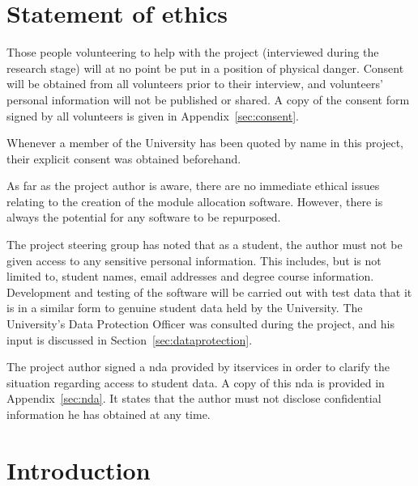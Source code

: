 \documentclass[draft]{scrartcl}
\let\stdsection\section
\renewcommand\section{\clearpage\stdsection}
\begin{document}
\clearpage
\tableofcontents

\clearpage
\listoffigures

\section{Statement of ethics}


Those people volunteering to help with the project (interviewed during the
research stage) will at no point be put in a position of physical danger.
Consent will be obtained from all volunteers prior to their interview, and
volunteers' personal information will not be published or shared. A copy of
the consent form signed by all volunteers is given in
Appendix~\ref{sec:consent}.

Whenever a member of the University has been quoted by name in this project,
their explicit consent was obtained beforehand.


As far as the project author is aware, there are no immediate ethical issues
relating to the creation of the module allocation software. However, there is
always the potential for any software to be repurposed.


The project steering group has noted that as a student, the author must not be
given access to any sensitive personal information. This includes, but is not
limited to, student names, email addresses and degree course information.
Development and testing of the software will be carried out with test data
that it is in a similar form to genuine student data held by the University.
The University's Data Protection Officer was consulted during the project, and
his input is discussed in Section~\ref{sec:dataprotection}.

The project author signed a \gls{nda} provided by \gls{itservices} in order to
clarify the situation regarding access to student data. A copy of this
\gls{nda} is provided in Appendix~\ref{sec:nda}. It states that the author
must not disclose confidential information he has obtained at any time.

\section{Introduction}

\end{document}
